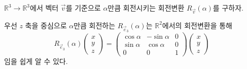 \documentclass[../engineering_mathematics_lecture_note.tex]{subfiles}
\begin{document}
\begin{remark}
    $\mathbb R^3 \rightarrow \mathbb R^3$에서 벡터 $\vec v$를 기준으로 $\alpha$만큼 회전시키는 회전변환 $R_{\vec v}(\alpha)$를 구하자.

    우선 $z$ 축을 중심으로 $\alpha$만큼 회전하는 $R_{\vec e_3}(\alpha)$는 $\mathbb R^2$에서의 회전변환을 통해
    \begin{equation*}
        R_{\vec e_3}(\alpha)
        \begin{pmatrix}
            x \\ y \\ z
        \end{pmatrix}
        =
        \begin{pmatrix}
            \cos \alpha & -\sin \alpha & 0\\
            \sin \alpha & \cos \alpha & 0\\
            0 & 0 & 1
        \end{pmatrix}
        \begin{pmatrix}
            x \\ y \\ z
        \end{pmatrix}
    \end{equation*}
    임을 쉽게 알 수 있다.


\end{remark}
\end{document}
